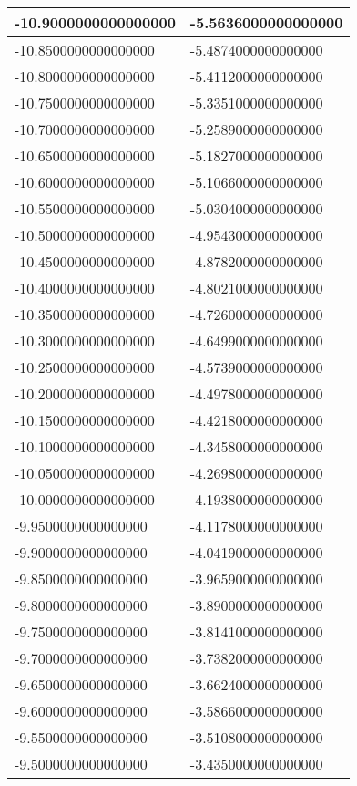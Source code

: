 \documentclass[a4paper,14pt]{article}
\begin{document}
\begin{longtable}{|l|l|}
-10.9000000000000000	&	-5.5636000000000000\\ \hline
-10.8500000000000000	&	-5.4874000000000000\\ \hline
-10.8000000000000000	&	-5.4112000000000000\\ \hline
-10.7500000000000000	&	-5.3351000000000000\\ \hline
-10.7000000000000000	&	-5.2589000000000000\\ \hline
-10.6500000000000000	&	-5.1827000000000000\\ \hline
-10.6000000000000000	&	-5.1066000000000000\\ \hline
-10.5500000000000000	&	-5.0304000000000000\\ \hline
-10.5000000000000000	&	-4.9543000000000000\\ \hline
-10.4500000000000000	&	-4.8782000000000000\\ \hline
-10.4000000000000000	&	-4.8021000000000000\\ \hline
-10.3500000000000000	&	-4.7260000000000000\\ \hline
-10.3000000000000000	&	-4.6499000000000000\\ \hline
-10.2500000000000000	&	-4.5739000000000000\\ \hline
-10.2000000000000000	&	-4.4978000000000000\\ \hline
-10.1500000000000000	&	-4.4218000000000000\\ \hline
-10.1000000000000000	&	-4.3458000000000000\\ \hline
-10.0500000000000000	&	-4.2698000000000000\\ \hline
-10.0000000000000000	&	-4.1938000000000000\\ \hline
-9.9500000000000000	&	-4.1178000000000000\\ \hline
-9.9000000000000000	&	-4.0419000000000000\\ \hline
-9.8500000000000000	&	-3.9659000000000000\\ \hline
-9.8000000000000000	&	-3.8900000000000000\\ \hline
-9.7500000000000000	&	-3.8141000000000000\\ \hline
-9.7000000000000000	&	-3.7382000000000000\\ \hline
-9.6500000000000000	&	-3.6624000000000000\\ \hline
-9.6000000000000000	&	-3.5866000000000000\\ \hline
-9.5500000000000000	&	-3.5108000000000000\\ \hline
-9.5000000000000000	&	-3.4350000000000000\\ \hline

\end{longtable}
\end{document}
